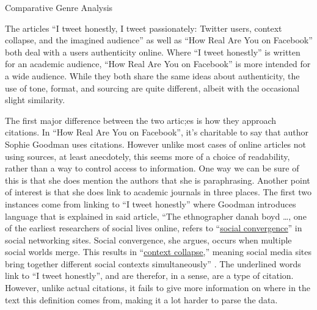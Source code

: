 \documentclass[12pt]{article}
\begin{document}
    \begin{doublespace}

        \begin{center}
            \vspace*{6pt}
            Comparative Genre Analysis
        \end{center}

    \vspace{-18pt}
    \par%
        The articles ``I tweet honestly, I tweet passionately: Twitter users, context collapse, and the imagined audience'' as well as ``How Real Are You on Facebook''
        both deal with a users authenticity online. Where ``I tweet honestly'' is written for an academic audience, ``How Real Are You on Facebook'' is more intended for a wide audience.
        While they both share the same ideas about authenticity, the use of tone, format, and sourcing are quite different, albeit with the occasional slight similarity. 
    \par%
        The first major difference between the two artic;es is how they approach citations. In ``How Real Are You on Facebook'', it's charitable to say that author Sophie Goodman uses citations.
        However unlike most cases of online articles not using sources, at least anecdotely, this seems more of a choice of readability, rather than a way to control access to information.
        One way we can be sure of this is that she does mention the authors that she is paraphrasing. Another point of interest is that she does link to academic journals in three places.
        The first two instances come from linking to ``I tweet honestly'' where Goodman introduces language that is explained in said article,
        ``The ethnographer danah boyd \dots, one of the earliest researchers of social lives online,
        refers to ``\underline{\href{http://con.sagepub.com/content/14/1/13.short?rss=1&ssource=mfr}{social convergence}}'' in social networking sites. Social convergence, she argues, occurs when multiple social worlds merge.
        This results in ``\underline{\href{http://nms.sagepub.com/content/13/1/114}{context collapse}},'' meaning social media sites bring together different social contexts simultaneously'' \autocite{facebook}. 
        The underlined words link to ``I tweet honestly'', and are therefor, in a sense, are a type of citation. However, unlike actual citations, it fails to give more information on where in the text this definition comes from, 
        making it a lot harder to parse the data.

\end{doublespace}
\end{document}
